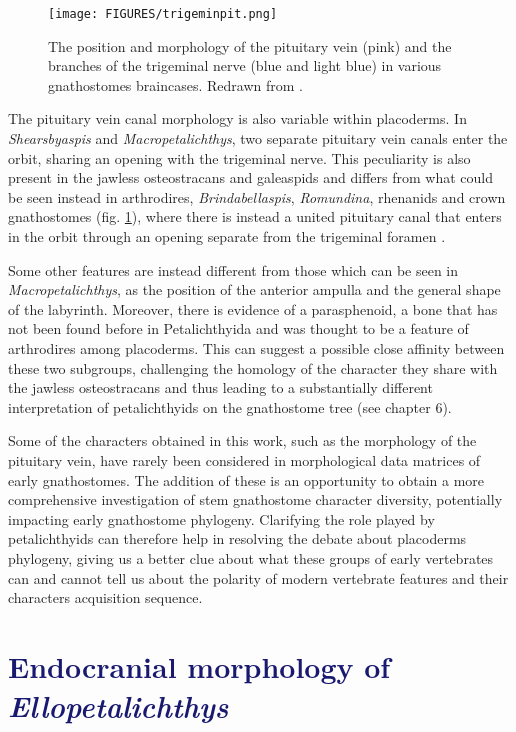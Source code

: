 \documentclass[11pt,letterpaper]{report}
\begin{document}
\begin{figure}[!h]
\centering
\texttt{[image: FIGURES/trigeminpit.png]}
\caption{\footnotesize{The position and morphology of the pituitary vein (pink) and the branches of the trigeminal nerve (blue and light blue) in various gnathostomes braincases. Redrawn from \citep{Stensi1963a,Stensi1969,Young1980,Maisey2005,Dupret2014}.}}
\label{trigempit}
\end{figure}

The pituitary vein canal morphology is also variable within placoderms. In \textit{Shearsbyaspis} and \textit{Macropetalichthys}, two separate pituitary vein canals enter the orbit, sharing an opening with the trigeminal nerve. This peculiarity is also present in the jawless osteostracans and galeaspids and differs from what could be seen instead in arthrodires, \textit{Brindabellaspis}, \textit{Romundina}, rhenanids and crown gnathostomes (fig. \ref{trigempit}), where there is instead a united pituitary canal that enters in the orbit through an opening separate from the trigeminal foramen \citep{Stensi1963a,Stensi1969,Young1980,Goujet1984a,Dupret2014,Maisey2005}. 

Some other features are instead different from those which can be seen in \textit{Macropetalichthys}, as the position of the anterior ampulla and the general shape of the labyrinth. Moreover, there is evidence of a parasphenoid, a bone that has not been found before in Petalichthyida and was thought to be a feature of arthrodires among placoderms. This can suggest a possible close affinity between these two subgroups, challenging the homology of the character they share with the jawless osteostracans and thus leading to a substantially different interpretation of petalichthyids on the gnathostome tree (see chapter 6).

Some of the characters obtained in this work, such as the morphology of the pituitary vein, have rarely been considered in morphological data matrices of early gnathostomes. The addition of these is an opportunity to obtain a more comprehensive investigation of stem gnathostome character diversity, potentially impacting early gnathostome phylogeny. Clarifying the role played by petalichthyids can therefore help in resolving the debate about placoderms phylogeny, giving us a better clue about what these groups of early vertebrates can and cannot tell us about the polarity of modern vertebrate features and their characters acquisition sequence.

\newpage
\chapter{\LARGE{\textcolor{MidnightBlue}{Endocranial morphology of \textit{Ellopetalichthys}}}}
\end{document}
